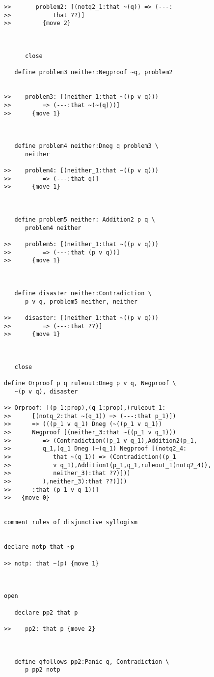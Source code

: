 \begin{verbatim}
>>       problem2: [(notq2_1:that ~(q)) => (---:
>>            that ??)]
>>         {move 2}



      close

   define problem3 neither:Negproof ~q, problem2


>>    problem3: [(neither_1:that ~((p v q)))
>>         => (---:that ~(~(q)))]
>>      {move 1}



   define problem4 neither:Dneg q problem3 \
      neither

>>    problem4: [(neither_1:that ~((p v q)))
>>         => (---:that q)]
>>      {move 1}



   define problem5 neither: Addition2 p q \
      problem4 neither

>>    problem5: [(neither_1:that ~((p v q)))
>>         => (---:that (p v q))]
>>      {move 1}



   define disaster neither:Contradiction \
      p v q, problem5 neither, neither

>>    disaster: [(neither_1:that ~((p v q)))
>>         => (---:that ??)]
>>      {move 1}



   close

define Orproof p q ruleout:Dneg p v q, Negproof \
   ~(p v q), disaster

>> Orproof: [(p_1:prop),(q_1:prop),(ruleout_1:
>>      [(notq_2:that ~(q_1)) => (---:that p_1)])
>>      => (((p_1 v q_1) Dneg (~((p_1 v q_1))
>>      Negproof [(neither_3:that ~((p_1 v q_1)))
>>         => (Contradiction((p_1 v q_1),Addition2(p_1,
>>         q_1,(q_1 Dneg (~(q_1) Negproof [(notq2_4:
>>            that ~(q_1)) => (Contradiction((p_1
>>            v q_1),Addition1(p_1,q_1,ruleout_1(notq2_4)),
>>            neither_3):that ??)]))
>>         ),neither_3):that ??)]))
>>      :that (p_1 v q_1))]
>>   {move 0}


comment rules of disjunctive syllogism


declare notp that ~p

>> notp: that ~(p) {move 1}



open

   declare pp2 that p

>>    pp2: that p {move 2}



   define qfollows pp2:Panic q, Contradiction \
      p pp2 notp


\end{verbatim}
